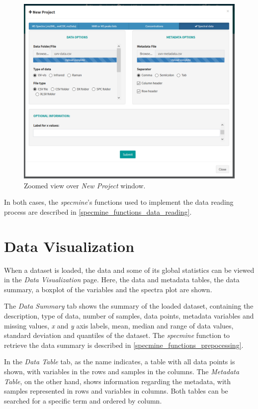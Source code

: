 \begin{figure}[h]
	\centering
	\includegraphics[width=0.8\linewidth]{Imagens/webspecmine_import}
	\caption{Zoomed view over \textit{New Project} window.}
	\label{webspecmine_import}
\end{figure}

In both cases, the \textit{specmine}'s functions used to implement the data reading process are described in \autoref{specmine_functions_data_reading}.


\section{Data Visualization}

When a dataset is loaded, the data and some of its global statistics can be viewed in the \textit{Data Visualization} page. Here, the data and metadata tables, the data summary, a boxplot of the variables and the spectra plot are shown. 

The \textit{Data Summary} tab shows the summary of the loaded dataset, containing the description, type of data, number of samples, data points, metadata variables and missing values, \textit{x} and \textit{y} axis labels, mean, median and range of data values, standard deviation and quantiles of the dataset. The \textit{specmine} function to retrieve the data summary is described in \autoref{specmine_functions_prepocessing}.

In the \textit{Data Table} tab, as the name indicates, a table with all data points is shown, with variables in the rows and samples in the columns. The \textit{Metadata Table}, on the other hand, shows information regarding the metadata, with samples represented in rows and variables in columns. Both tables can be searched for a specific term and ordered by column.

